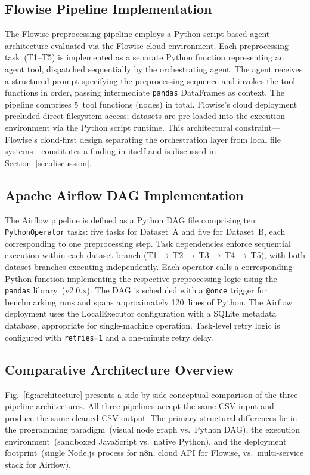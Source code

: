 \documentclass[journal]{IEEEtran}
\begin{document}
\subsection{Flowise Pipeline Implementation}

The Flowise preprocessing pipeline employs a Python-script-based agent
architecture evaluated via the Flowise cloud environment. Each
preprocessing task~(T1--T5) is implemented as a separate Python function
representing an agent tool, dispatched sequentially by the orchestrating
agent. The agent receives a structured prompt specifying the preprocessing
sequence and invokes the tool functions in order, passing intermediate
\texttt{pandas} DataFrames as context. The pipeline comprises 5~tool
functions (nodes) in total. Flowise's cloud deployment precluded direct
filesystem access; datasets are pre-loaded into the execution environment
via the Python script runtime. This architectural constraint---Flowise's
cloud-first design separating the orchestration layer from local file
systems---constitutes a finding in itself and is discussed in
Section~\ref{sec:discussion}.

\subsection{Apache Airflow DAG Implementation}

The Airflow pipeline is defined as a Python DAG file comprising ten
\texttt{PythonOperator} tasks: five tasks for Dataset~A and five for
Dataset~B, each corresponding to one preprocessing step. Task dependencies
enforce sequential execution within each dataset branch
(T1\,$\to$\,T2\,$\to$\,T3\,$\to$\,T4\,$\to$\,T5), with both dataset
branches executing independently. Each operator calls a corresponding
Python function implementing the respective preprocessing logic using
the \texttt{pandas} library~(v2.0.x). The DAG is scheduled with a
\texttt{@once} trigger for benchmarking runs and spans approximately
120~lines of Python. The Airflow deployment uses the LocalExecutor
configuration with a SQLite metadata database, appropriate for
single-machine operation. Task-level retry logic is configured with
\texttt{retries=1} and a one-minute retry delay.

\subsection{Comparative Architecture Overview}

Fig.~\ref{fig:architecture} presents a side-by-side conceptual comparison
of the three pipeline architectures. All three pipelines accept the same
CSV input and produce the same cleaned CSV output. The primary structural
differences lie in the programming paradigm~(visual node graph vs.\
Python DAG), the execution environment~(sandboxed JavaScript vs.\ native
Python), and the deployment footprint~(single Node.js process for n8n,
cloud API for Flowise, vs.\ multi-service stack for Airflow).
\end{document}
